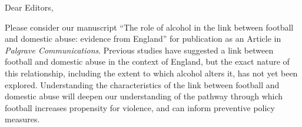 \documentclass{letter}
\begin{document}
\begin{letter}
{}

%
%



%

\opening{Dear Editors,} %

Please consider our manuscript ``The role of alcohol in the link between football and domestic abuse: evidence from England'' for publication as an Article in \textit{Palgrave Communications}. Previous studies have suggested a link between football and domestic abuse in the context of England, but the exact nature of this relationship, including the extent to which alcohol alters it, has not yet been explored. Understanding the characteristics of the link between football and domestic abuse will deepen our understanding of the pathway through which football increases propensity for violence, and can inform preventive policy measures.



\end{letter}
\end{document}
